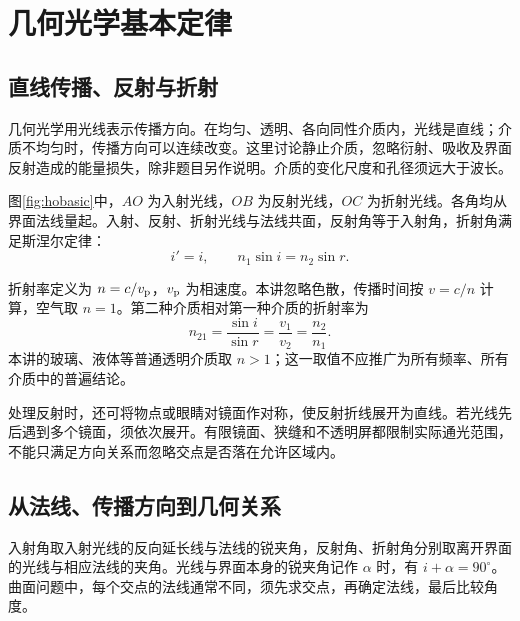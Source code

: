 \section{几何光学基本定律}

\subsection{直线传播、反射与折射}

几何光学用光线表示传播方向。在均匀、透明、各向同性介质内，光线是直线；介质不均匀时，传播方向可以连续改变。这里讨论静止介质，忽略衍射、吸收及界面反射造成的能量损失，除非题目另作说明。介质的变化尺度和孔径须远大于波长。

图\ref{fig:hobasic}中，$AO$ 为入射光线，$OB$ 为反射光线，$OC$ 为折射光线。各角均从界面法线量起。入射、反射、折射光线与法线共面，反射角等于入射角，折射角满足斯涅尔定律：
\begin{equation}\label{eq:hosnell}
i'=i,\qquad n_1\sin i=n_2\sin r.
\end{equation}

折射率定义为 $n=c/v_{\rm p}$，$v_{\rm p}$ 为相速度。本讲忽略色散，传播时间按 $v=c/n$ 计算，空气取 $n=1$。第二种介质相对第一种介质的折射率为
\[
n_{21}=\frac{\sin i}{\sin r}=\frac{v_1}{v_2}=\frac{n_2}{n_1}.
\]
本讲的玻璃、液体等普通透明介质取 $n>1$；这一取值不应推广为所有频率、所有介质中的普遍结论。

处理反射时，还可将物点或眼睛对镜面作对称，使反射折线展开为直线。若光线先后遇到多个镜面，须依次展开。有限镜面、狭缝和不透明屏都限制实际通光范围，不能只满足方向关系而忽略交点是否落在允许区域内。

\subsection{从法线、传播方向到几何关系}

入射角取入射光线的反向延长线与法线的锐夹角，反射角、折射角分别取离开界面的光线与相应法线的夹角。光线与界面本身的锐夹角记作 $\alpha$ 时，有 $i+\alpha=90^\circ$。曲面问题中，每个交点的法线通常不同，须先求交点，再确定法线，最后比较角度。

